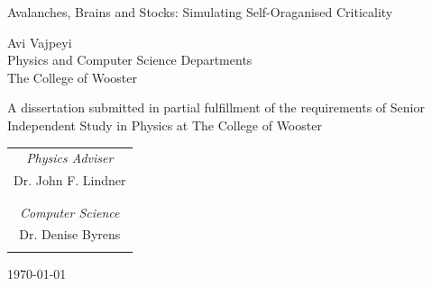 \documentclass{book}
\begin{document}
\frontmatter

\begin{titlepage}
	\begin{center}

		\huge{Avalanches, Brains and Stocks: Simulating Self-Oraganised Criticality}

		\vspace{2.5cm}

		\LARGE{Avi Vajpeyi}\\ 
		\LARGE{Physics and Computer Science Departments}\\
		\LARGE{The College of Wooster}\\
		
		\vspace{0.5cm}
		
		\large A dissertation submitted in partial fulfillment 
		of the requirements of  Senior Independent Study in Physics at The College of Wooster\\
		
		\vspace{2.5cm}
		
		\begin{table}[h!]
			\begin{center}
				\begin{tabular}{c}
				
					\large{\emph{Physics Adviser}}\\
					\large{Dr. John F. Lindner}\\
					\vspace{0.5cm}\\
					\hline
					
					\vspace{1.0cm}\\
					\large{\emph{Computer Science}}\\
					\large{Dr. Denise Byrens}\\
					\vspace{0.5cm}\\
					\hline
					
				\end{tabular}
			\end{center}
		\end{table}
		
		\vspace{2.5cm}

		\large{\today}

	\end{center}
\end{titlepage}
\end{document}
